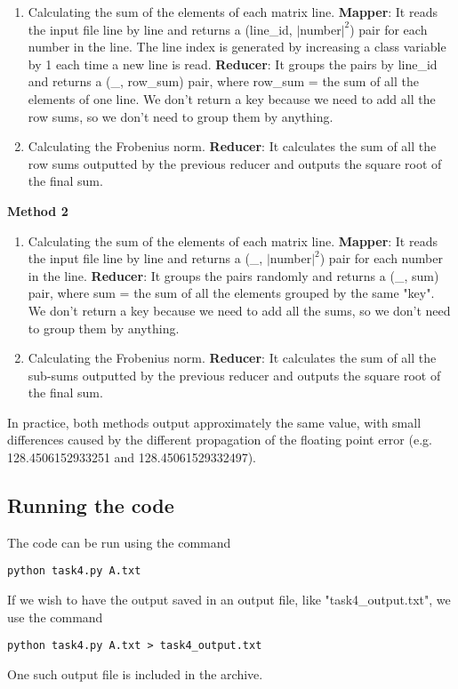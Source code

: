 \documentclass[12pt, a4paper]{article}
\begin{document}
\begin{enumerate}[label=\textbf{Step \arabic*.}, wide=0pt, leftmargin=2em]
	\item Calculating the sum of the elements of each matrix line.
		\subitem \textbf{Mapper}: It reads the input file line by line and returns a (line\_id, $\vert$number$\vert^2$) pair for each number in the line. The line index is generated by increasing a class variable by 1 each time a new line is read.
		\subitem \textbf{Reducer}: It groups the pairs by line\_id and returns a (\_, row\_sum) pair, where row\_sum = the sum of all the elements of one line. We don't return a key because we need to add all the row sums, so we don't need to group them by anything.
	\item Calculating the Frobenius norm.
		\subitem \textbf{Reducer}: It calculates the sum of all the row sums outputted by the previous reducer and outputs the square root of the final sum.
\end{enumerate}

\noindent\textbf{Method 2}

\begin{enumerate}[label=\textbf{Step \arabic*.}, wide=0pt, leftmargin=2em]
	\item Calculating the sum of the elements of each matrix line.
		\subitem \textbf{Mapper}: It reads the input file line by line and returns a (\_, $\vert$number$\vert^2$) pair for each number in the line.
		\subitem \textbf{Reducer}: It groups the pairs randomly and returns a (\_, sum) pair, where sum = the sum of all the elements grouped by the same "key". We don't return a key because we need to add all the sums, so we don't need to group them by anything.
	\item Calculating the Frobenius norm.
		\subitem \textbf{Reducer}: It calculates the sum of all the sub-sums outputted by the previous reducer and outputs the square root of the final sum.
\end{enumerate}

In practice, both methods output approximately the same value, with small differences caused by the different propagation of the floating point error (e.g. 128.4506152933251 and 128.45061529332497).

\subsection {Running the code}
The code can be run using the command \\

\centerline{\texttt{python task4.py A.txt}}

If we wish to have the output saved in an output file, like "task4\_output.txt", we use the command \\

\centerline{\texttt{python task4.py A.txt > task4\_output.txt}}
\hfill 

\noindent
One such output file is included in the archive.
\end{document}
